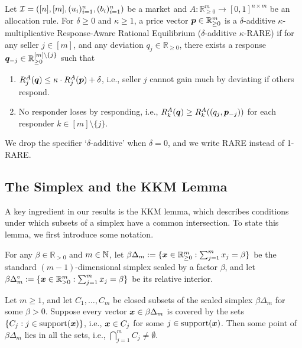 \begin{definition}[RARE]
Let $\mathcal{I} = ([n], [m], (u_i)_{i=1}^n, (b_i)_{i=1}^n)$ be a market
and $A: \mathbb{R}_{\ge 0}^m \to [0, 1]^{n \times m}$ be an allocation rule.
For $\delta \ge 0$ and $\kappa \ge 1$, a price vector $\bm{p} \in \mathbb{R}_{\ge 0}^m$
is a $\delta$-additive $\kappa$-multiplicative Response-Aware Rational Equilibrium
($\delta$-additive $\kappa$-RARE)
if for any seller $j \in [m]$, and any deviation $q_j \in \mathbb{R}_{\ge 0}$,
there exists a response $\bm{q}_{-j} \in \mathbb{R}_{\ge 0}^{[m] \setminus \{j\}}$ such that
\begin{enumerate}
\item $R_j^A(\bm{q}) \le \kappa \cdot R_j^A(\bm{p}) + \delta$,
    i.e., seller $j$ cannot gain much by deviating if others respond.
\item No responder loses by responding, i.e., $R_k^A(\bm{q}) \ge R_k^A((q_j, \bm{p}_{-j}))$
    for each responder $k \in [m] \setminus \{j\}$.
\end{enumerate}
We drop the specifier `$\delta$-additive' when $\delta = 0$,
and we write RARE instead of 1-RARE.
\end{definition}

\subsection{The Simplex and the KKM Lemma}

A key ingredient in our results is the KKM lemma, which describes conditions under which
subsets of a simplex have a common intersection.
To state this lemma, we first introduce some notation.

For any $\beta \in \mathbb{R}_{> 0}$ and $m \in \mathbb{N}$,
let $\beta\Delta_m := \{\bm{x} \in \mathbb{R}_{\ge 0}^m: \sum_{j=1}^m x_j = \beta\}$
be the standard $(m-1)$-dimensional simplex scaled by a factor $\beta$,
and let $\beta\Delta_m^{\circ} := \{\bm{x} \in \mathbb{R}_{> 0}^m: \sum_{j=1}^m x_j = \beta\}$
be its relative interior.

\begin{lemma}
\label{thm:kkm}
Let $m \ge 1$, and let $C_1, \ldots, C_m$ be closed subsets of
the scaled simplex $\beta\Delta_m$ for some $\beta > 0$.
Suppose every vector $\bm{x} \in \beta\Delta_m$ is covered by the sets
$\{C_j: j \in \operatorname{support}(\bm{x})\}$, i.e., $\bm{x} \in C_j$ for some $j \in \operatorname{support}(\bm{x})$.
Then some point of $\beta\Delta_m$ lies in all the sets, i.e., $\bigcap_{j=1}^m C_j \ne \emptyset$.
\end{lemma}
